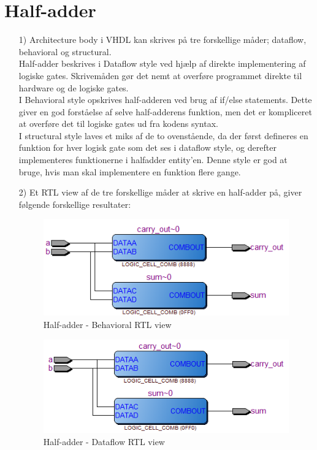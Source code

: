 \section{Half-adder}
\begin{enumerate}
	\item[1)]
	Architecture body i VHDL kan skrives på tre forskellige måder; dataflow, behavioral og structural. \\
	Half-adder beskrives i Dataflow style ved hjælp af direkte implementering af logiske gates. Skrivemåden gør det nemt at overføre programmet direkte til hardware og de logiske gates. \\
	I Behavioral style opskrives half-adderen ved brug af if/else statements. Dette giver en god forståelse af selve half-adderens funktion, men det er kompliceret at overføre det til logiske gates ud fra kodens syntax. \\
	I structural style laves et miks af de to ovenstående, da der først defineres en funktion for hver logisk gate som det ses i dataflow style, og derefter implementeres funktionerne i halfadder entity’en. Denne style er god at bruge, hvis man skal implementere en funktion flere gange.\\
	\item[2)]
	Et RTL view af de tre forskellige måder at skrive en half-adder på, giver følgende forskellige resultater:\\
\begin{figure}[h]
	\centering
\includegraphics[scale=0.8]{pictures/Oevelse1/Half_adder/Behavioral.JPG}
\caption{Half-adder - Behavioral RTL view}
\label{fig:HaBehavioralRTL}
\end{figure}

\begin{figure}[h]
	\centering
	\includegraphics[scale=0.8]{pictures/Oevelse1/Half_adder/dataflow.JPG}
	\caption{Half-adder - Dataflow RTL view}
	\label{fig:HaDataflowRTL}
\end{figure}


\end{enumerate}
